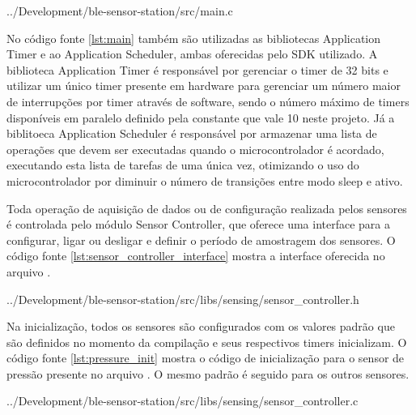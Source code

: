 \begin{minipage}{0.95\linewidth}  

{../Development/ble-sensor-station/src/main.c}
\end{minipage}

No código fonte \ref{lst:main} também são utilizadas as bibliotecas Application
Timer e ao Application Scheduler, ambas oferecidas pelo SDK utilizado. A
biblioteca Application Timer é responsável por gerenciar o timer de 32 bits e
utilizar um único timer presente em hardware para gerenciar um número maior de
interrupções por timer através de software, sendo o número máximo de timers
disponíveis em paralelo definido pela constante
 que vale 10 neste projeto. Já a
biblitoeca Application Scheduler é responsável por armazenar uma lista de
operações que devem ser executadas quando o microcontrolador é acordado,
executando esta lista de tarefas de uma única vez, otimizando o uso do
microcontrolador por diminuir o número de transições entre modo sleep e ativo.


Toda operação de aquisição de dados ou de configuração realizada pelos sensores
é controlada pelo módulo Sensor Controller, que oferece uma interface para a
configurar, ligar ou desligar e definir o período de amostragem dos sensores. O
código fonte \ref{lst:sensor_controller_interface} mostra a interface oferecida
no arquivo .
 
\begin{minipage}{0.95\linewidth} 

{../Development/ble-sensor-station/src/libs/sensing/sensor_controller.h}
\end{minipage}

Na inicialização, todos os sensores são configurados com os valores padrão que
são definidos no momento da compilação e seus respectivos timers inicializam. O
código fonte \ref{lst:pressure_init} mostra o código de inicialização para o
sensor de pressão presente no arquivo . O mesmo
padrão é seguido para os outros sensores.

\begin{minipage}{0.95\linewidth} 
 
{../Development/ble-sensor-station/src/libs/sensing/sensor_controller.c}
\end{minipage}

